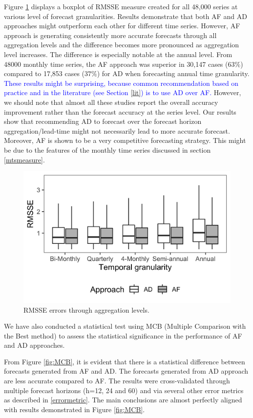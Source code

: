 \documentclass[preprint, 3p,
authoryear]{elsarticle} %
\begin{document}
Figure \ref{fig:RMSSE} displays a boxplot of RMSSE measure created for
all 48,000 series at various level of forecast granularities. Results
demonstrate that both AF and AD approaches might outperform each other
for different time series. However, AF approach is generating
consistently more accurate forecasts through all aggregation levels and
the difference becomes more pronounced as aggregation level increases.
The difference is especially notable at the annual level. From 48000
monthly time series, the AF approach was superior in 30,147 cases
(\(63\%\)) compared to 17,853 cases (\(37\%\)) for AD when forecasting
annual time granularity.
\textcolor{blue}{These results might be surprising, because common recommendation based on practice and in the literature (see Section \ref{lit}) is to use AD over AF.}
However, we should note that almost all these studies report the overall
accuracy improvement rather than the forecast accuracy at the series
level. Our results show that recommending AD to forecast over the
forecast horizon aggregation/lead-time might not necessarily lead to
more accurate forecast. Moreover, AF is shown to be a very competitive
forecasting strategy. This might be due to the features of the monthly
time series discussed in section \ref{mtsmeasure}.

\begin{figure}[H]

{\centering \includegraphics[width=0.7\linewidth]{img/300dpi/box_plot_rmsse} 

}

\caption{RMSSE errors through aggregation levels.}\label{fig:RMSSE}
\end{figure}

We have also conducted a statistical test using MCB (Multiple Comparison
with the Best method) \citep{MCB} to assess the statistical significance
in the performance of AF and AD approaches.

From Figure \ref{fig:MCB}, it is evident that there is a statistical
difference between forecasts generated from AF and AD. The forecasts
generated from AD approach are less accurate compared to AF. The results
were cross-validated through multiple forecast horizons (h=12, 24 and
60) and via several other error metrics as described in
\ref{errormetric}. The main conclusions are almost perfectly aligned
with results demonstrated in Figure \ref{fig:MCB}.
\end{document}
